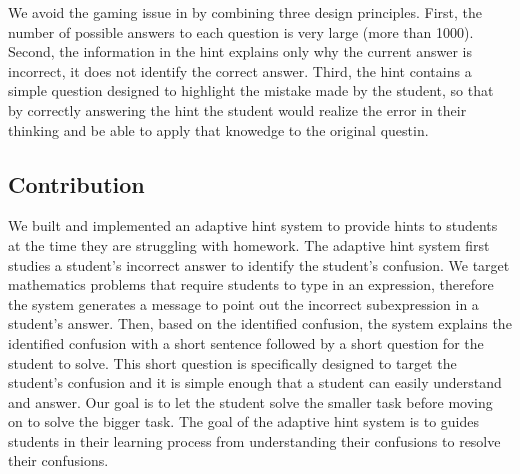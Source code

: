\documentclass{sigchi/sigchi}
\begin{document}
We avoid the gaming issue in by combining three design principles.
First, the number of possible answers to each question is very large
(more than 1000). Second, the information in the hint explains only
why the current answer is incorrect, it does not identify the correct
answer. Third, the hint contains a simple question designed to
highlight the mistake made by the student, so that by correctly
answering the hint the student would realize the error in their
thinking and be able to apply that knowedge to the original questin.

\subsection*{Contribution}
We built and implemented an adaptive hint system to provide hints to
students at the time they are struggling with homework. The adaptive
hint system first studies a student's incorrect answer to identify the
student's confusion. We target mathematics problems that require
students to type in an expression, therefore the system generates a
message to point out the incorrect subexpression in a student's
answer. Then, based on the identified confusion, the system explains
the identified confusion with a short sentence followed by a short
question for the student to solve. This short question is specifically
designed to target the student's confusion and it is simple enough
that a student can easily understand and answer. Our goal is to let
the student solve the smaller task before moving on to solve the
bigger task. The goal of the adaptive hint system is to guides
students in their learning process from understanding their confusions
to resolve their confusions.
\end{document}
